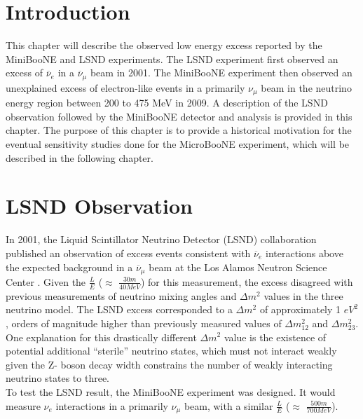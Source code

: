 
\section{Introduction}
This chapter will describe the observed low energy excess reported by the MiniBooNE and LSND experiments. The LSND experiment first observed an excess of $\overline{\nu}_e$ in a $\overline{\nu}_\mu$ beam in 2001. The MiniBooNE experiment then observed an unexplained excess of electron-like events in a primarily $\nu_\mu$ beam in the neutrino energy region between 200 to 475 MeV in 2009. A description of the LSND observation followed by the MiniBooNE detector and analysis is provided in this chapter. The purpose of this chapter is to provide a historical motivation for the eventual sensitivity studies done for the MicroBooNE experiment, which will be described in the following chapter.\\

\section{LSND Observation}

In 2001, the Liquid Scintillator Neutrino Detector (LSND) collaboration published an observation of excess events consistent with $\overline{\nu}_e$ interactions above the expected background in a $\overline{\nu}_\mu$ beam at the Los Alamos Neutron Science Center \cite{LSNDPaper}. Given the $\frac{L}{E}$ ($\approx$ $\frac{30 m}{40 MeV}$) for this measurement, the excess disagreed with previous measurements of neutrino mixing angles and $\Delta m^2$ values in the three neutrino model. The LSND excess corresponded to a $\Delta m^2$ of approximately 1 $eV^2$, orders of magnitude higher than previously measured values of $\Delta m_{12}^2$ and $\Delta m_{23}^2$. One explanation for this drastically different $\Delta m^2$ value is the existence of potential additional ``sterile'' neutrino states, which must not interact weakly given the Z- boson decay width constrains the number of weakly interacting neutrino states to three.\\

To test the LSND result, the MiniBooNE experiment was designed. It would measure $\nu_e$ interactions in a primarily $\nu_\mu$ beam, with a similar $\frac{L}{E}$ ($\approx$ $\frac{500m}{700 MeV}$).


